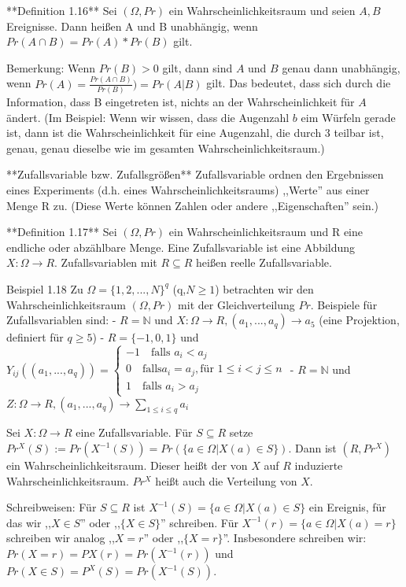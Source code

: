 \documentclass[a4paper]{article}
\begin{document}
\begin{multicols}{3}
    **Definition 1.16** Sei $(\Omega,Pr)$ ein Wahrscheinlichkeitsraum und seien $A,B$ Ereignisse. Dann heißen A und B unabhängig, wenn $Pr(A\cap B)=Pr(A)*Pr(B)$ gilt.

    Bemerkung: Wenn $Pr(B)> 0$ gilt, dann sind $A$ und $B$ genau dann unabhängig, wenn $Pr(A) = \frac{Pr(A\cap B)}{Pr(B)})= Pr(A|B)$ gilt. Das bedeutet, dass sich durch die Information, dass B eingetreten ist, nichts an der Wahrscheinlichkeit für $A$ ändert. (Im Beispiel: Wenn wir wissen, dass die Augenzahl $b$  eim Würfeln gerade ist, dann ist die Wahrscheinlichkeit für eine Augenzahl, die durch 3 teilbar ist, genau, genau dieselbe wie im gesamten Wahrscheinlichkeitsraum.)

    **Zufallsvariable bzw. Zufallsgrößen** Zufallsvariable ordnen den Ergebnissen eines Experiments (d.h. eines Wahrscheinlichkeitsraums) ,,Werte''  aus einer Menge R zu. (Diese Werte können Zahlen oder andere ,,Eigenschaften'' sein.)

    **Definition 1.17** Sei $(\Omega,Pr)$ ein Wahrscheinlichkeitsraum und R eine endliche oder abzählbare Menge. Eine Zufallsvariable ist eine Abbildung $X:\Omega\rightarrow R$.
    Zufallsvariablen mit $R\subseteq R$ heißen reelle Zufallsvariable.

    Beispiel 1.18 Zu $\Omega=\{1,2,...,N\}^q$ (q,$N\geq 1$) betrachten wir den Wahrscheinlichkeitsraum $(\Omega,Pr)$ mit der Gleichverteilung $Pr$. Beispiele für Zufallsvariablen sind:
    - $R=\mathbb{N}$ und $X:\Omega\rightarrow R,(a_1,...,a_q)\rightarrow a_5$ (eine Projektion, definiert für $q\geq 5$)
    - $R=\{-1,0,1\}$ und $Y_{ij}((a_1,...,a_q))=\begin{cases} -1\quad\text{falls } a_i< a_j\\ 0\quad\text{falls} a_i=a_j, \text{für } 1\leq i < j\leq n \\ 1\quad\text{falls } a_i> a_j\end{cases}$
    - $R=\mathbb{N}$ und $Z:\Omega\rightarrow R,(a_1 ,...,a_q)\rightarrow\sum_{1\leq i\leq q} a_i$

    Sei $X:\Omega\rightarrow R$ eine Zufallsvariable. Für $S\subseteq R$ setze $Pr^X(S):= Pr(X^{-1}(S))=Pr(\{a\in\Omega|X(a)\in S\})$. Dann ist $(R,Pr^X)$ ein Wahrscheinlichkeitsraum. Dieser heißt der von $X$ auf $R$ induzierte Wahrscheinlichkeitsraum. $Pr^X$ heißt auch die Verteilung von $X$.

    Schreibweisen: Für $S\subseteq R$ ist $X^{-1}(S)=\{a\in\Omega|X(a)\in S\}$ ein Ereignis, für das wir ,,$X\in S$'' oder ,,$\{X\in S\}$'' schreiben. Für $X^{-1}(r)=\{a\in\Omega|X(a) =r\}$ schreiben wir analog ,,$X=r$'' oder ,,$\{X=r\}$''. Insbesondere schreiben wir: $Pr(X=r)=PX(r)=Pr(X^{-1}(r))$ und $Pr(X\in S)=P^X(S)=Pr(X^{-1}(S))$.


\end{multicols}
\end{document}
